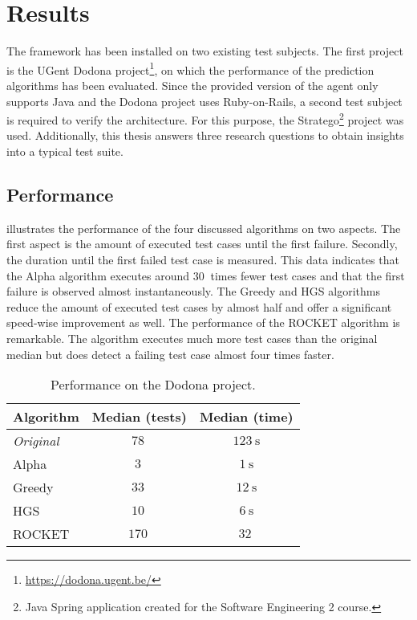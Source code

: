 \section{Results}
\noindent The framework has been installed on two existing test subjects. The first project is the UGent Dodona project\footnote{\url{https://dodona.ugent.be/}}, on which the performance of the prediction algorithms has been evaluated. Since the provided version of the agent only supports Java and the Dodona project uses Ruby-on-Rails, a second test subject is required to verify the architecture. For this purpose, the Stratego\footnote{Java Spring application created for the Software Engineering 2 course.} project was used. Additionally, this thesis answers three research questions to obtain insights into a typical test suite.

\subsection{Performance}
\noindent {} illustrates the performance of the four discussed algorithms on two aspects. The first aspect is the amount of executed test cases until the first failure. Secondly, the duration until the first failed test case is measured. This data indicates that the Alpha algorithm executes around $\SI{30}{}$ times fewer test cases and that the first failure is observed almost instantaneously. The Greedy and HGS algorithms reduce the amount of executed test cases by almost half and offer a significant speed-wise improvement as well. The performance of the ROCKET algorithm is remarkable. The algorithm executes much more test cases than the original median but does detect a failing test case almost four times faster.

\begin{table}[h]
	\centering
	\begin{tabularx}{\columnwidth}{|X||c|c|}
		\hline
		\textbf{Algorithm} & \textbf{Median (tests)} & \textbf{Median (time)}\\
		\hline
		\emph{Original} & $\SI{78}{}$ & $\SI{123}{\second}$\\
		
		\hline
		
		Alpha & $\SI{3}{}$ & $\SI{1}{\second}$\\
		
		Greedy & $\SI{33}{}$ & $\SI{12}{\second}$\\
		
		HGS & $\SI{10}{}$ & $\SI{6}{\second}$\\
		
		ROCKET & $\SI{170}{}$ & $\SI{32}{}$\\
		
		\hline
	\end{tabularx}
	\caption{Performance on the Dodona project.}
	\label{tbl:performance-dodona}
\end{table}

